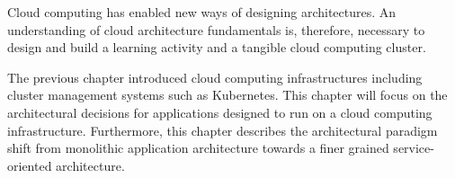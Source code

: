 
\begin{theorem}
    Cloud computing has enabled new ways of designing architectures. An understanding of cloud architecture fundamentals is, therefore, necessary to design and build a learning activity and a tangible cloud computing cluster.
\end{theorem}

\noindent
The previous chapter introduced cloud computing infrastructures including cluster management systems such as Kubernetes. This chapter will focus on the architectural decisions for applications designed to run on a cloud computing infrastructure. Furthermore, this chapter describes the architectural paradigm shift from monolithic application architecture towards a finer grained service-oriented architecture.
